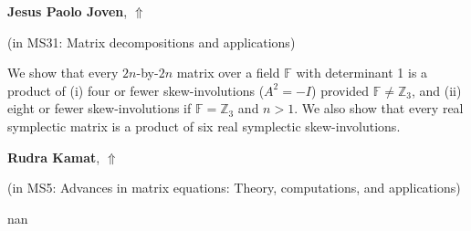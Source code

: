 \documentclass[ILAS2025-program.tex]{subfiles}
\begin{document}
     \hypertarget{down0308}{}\begin{ilasabstract}
    
    \textbf{Jesus Paolo Joven},  \hfill \hyperlink{up0308}{$\Uparrow$}
    
    (in {\color{mstitle}MS31: Matrix decompositions and applications})
        
        \mtskip
    We show that every $2n$-by-$2n$ matrix over a field $\mathbb{F}$ with determinant 1 is a product of (i) four or fewer skew-involutions ($A^2 = -I$) provided $\mathbb{F} \neq \mathbb{Z}_3$, and (ii) eight or fewer skew-involutions if $\mathbb{F} = \mathbb{Z}_3$ and $n > 1$. We also show that every real symplectic matrix is a product of six real symplectic skew-involutions. 
\end{ilasabstract}
     \hypertarget{down0322}{}\begin{ilasabstract}
    
    \textbf{Rudra Kamat},  \hfill \hyperlink{up0322}{$\Uparrow$}
    
    (in {\color{mstitle}MS5: Advances in matrix equations: Theory, computations, and applications})
        
        \mtskip
    nan\end{ilasabstract}
\end{document}
